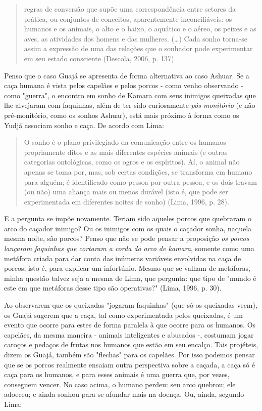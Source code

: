 \begin{quote}
regras de conversão que supõe uma correspondência entre setores da
prática, ou conjuntos de conceitos, aparentemente inconciliáveis: os
humanos e os animais, o alto e o baixo, o aquático e o aéreo, os peixes
e as aves, as atividades dos homens e das mulheres. (\ldots{}) Cada sonho
torna-se assim a expressão de uma das relações que o sonhador pode
experimentar em seu estado consciente (Descola, 2006, p. 137).
\end{quote}

Penso que o caso Guajá se apresenta de forma alternativa ao caso Ashuar.
Se a caça humana é vista pelos capelães e pelos porcos - como venho
observando - como "guerra", o encontro em sonho de Kamara com seus
inimigos queixadas que lhe alvejaram com faquinhas, além de ter sido
curiosamente \emph{pós-monitório} (e não pré-monitório, como os sonhos
Ashuar), está mais próximo à forma como os Yudjá associam sonho e caça.
De acordo com Lima:

\begin{quote}
O sonho é o plano privilegiado da comunicação entre os humanos
propriamente ditos e as mais diferentes espécies animais (e outras
categorias ontológicas, como os ogros e os espíritos). Aí, o animal não
apenas se toma por, mas, sob certas condições, se transforma em humano
para alguém; é identificado como pessoa por outra pessoa, e os dois
travam (ou não) uma aliança mais ou menos durável (isto é, que pode ser
experimentada em diferentes noites de sonho) (Lima, 1996, p. 28).
\end{quote}

E a pergunta se impõe novamente. Teriam sido aqueles porcos que
quebraram o arco do caçador inimigo? Ou os inimigos com os quais o
caçador sonha, naquela mesma noite, são porcos? Penso que não se pode
pensar a proposição \emph{os porcos lançaram faquinhas que cortaram a
corda do arco de kamara}, somente como uma metáfora criada para dar
conta das inúmeras variáveis envolvidas na caça de porcos, isto é, para
explicar um infortúnio. Mesmo que se valham de metáforas, minha questão
talvez seja a mesma de Lima, que pergunta: que tipo de "mundo é este em
que metáforas desse tipo são operativas?" (Lima, 1996, p. 30).

Ao observarem que os queixadas "jogaram faquinhas" (que só os queixadas
veem), os Guajá sugerem que a caça, tal como experimentada pelos
queixadas, é um evento que ocorre para estes de forma paralela à que
ocorre para os humanos. Os capelães, da mesma maneira - animais
inteligentes e abusados -, costumam jogar caroços e pedaços de frutas
nos humanos que estão em seu encalço. Tais projéteis, dizem os Guajá,
também são "flechas" para os capelães. Por isso podemos pensar que se os
porcos realmente ensaiam outra perspectiva sobre a caçada, a caça só é
caça para os humanos, e para esses animais é uma guerra que, por vezes,
conseguem vencer. No caso acima, o humano perdeu: seu arco quebrou; ele
adoeceu; e ainda sonhou para se afundar mais na doença. Ou, ainda,
segundo Lima:

